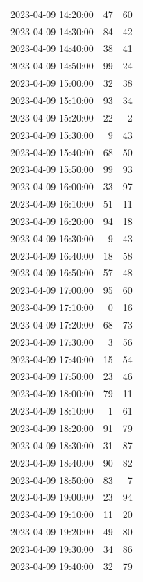 \documentclass[
  letterpaper,
  DIV=11,
  numbers=noendperiod]{scrartcl}
\begin{document}
\begin{tabular}{lrr}
2023-04-09 14:20:00 &    47 &    60 \\
2023-04-09 14:30:00 &    84 &    42 \\
2023-04-09 14:40:00 &    38 &    41 \\
2023-04-09 14:50:00 &    99 &    24 \\
2023-04-09 15:00:00 &    32 &    38 \\
2023-04-09 15:10:00 &    93 &    34 \\
2023-04-09 15:20:00 &    22 &     2 \\
2023-04-09 15:30:00 &     9 &    43 \\
2023-04-09 15:40:00 &    68 &    50 \\
2023-04-09 15:50:00 &    99 &    93 \\
2023-04-09 16:00:00 &    33 &    97 \\
2023-04-09 16:10:00 &    51 &    11 \\
2023-04-09 16:20:00 &    94 &    18 \\
2023-04-09 16:30:00 &     9 &    43 \\
2023-04-09 16:40:00 &    18 &    58 \\
2023-04-09 16:50:00 &    57 &    48 \\
2023-04-09 17:00:00 &    95 &    60 \\
2023-04-09 17:10:00 &     0 &    16 \\
2023-04-09 17:20:00 &    68 &    73 \\
2023-04-09 17:30:00 &     3 &    56 \\
2023-04-09 17:40:00 &    15 &    54 \\
2023-04-09 17:50:00 &    23 &    46 \\
2023-04-09 18:00:00 &    79 &    11 \\
2023-04-09 18:10:00 &     1 &    61 \\
2023-04-09 18:20:00 &    91 &    79 \\
2023-04-09 18:30:00 &    31 &    87 \\
2023-04-09 18:40:00 &    90 &    82 \\
2023-04-09 18:50:00 &    83 &     7 \\
2023-04-09 19:00:00 &    23 &    94 \\
2023-04-09 19:10:00 &    11 &    20 \\
2023-04-09 19:20:00 &    49 &    80 \\
2023-04-09 19:30:00 &    34 &    86 \\
2023-04-09 19:40:00 &    32 &    79 \\

\end{tabular}
\end{document}
